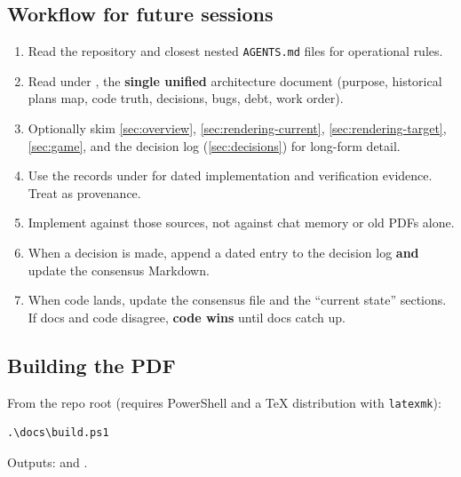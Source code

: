 \subsection{Workflow for future sessions}
\begin{enumerate}
  \item Read the repository and closest nested \texttt{AGENTS.md} files for
        operational rules.
  \item Read  under , the \textbf{single
        unified} architecture document (purpose, historical plans map, code
        truth, decisions, bugs, debt, work order).
  \item Optionally skim \cref{sec:overview}, \cref{sec:rendering-current},
        \cref{sec:rendering-target}, \cref{sec:game}, and the decision log
        (\cref{sec:decisions}) for long-form detail.
  \item Use the records under  for dated implementation
        and verification evidence. Treat  as provenance.
  \item Implement against those sources, not against chat memory or old PDFs alone.
  \item When a decision is made, append a dated entry to the decision log
        \textbf{and} update the consensus Markdown.
  \item When code lands, update the consensus file and the ``current state''
        sections. If docs and code disagree, \textbf{code wins} until docs catch up.
\end{enumerate}

\subsection{Building the PDF}
From the repo root (requires PowerShell and a TeX distribution with
\texttt{latexmk}):
\begin{lstlisting}[language={}]
.\docs\build.ps1
\end{lstlisting}

\noindent Outputs:  and
.

